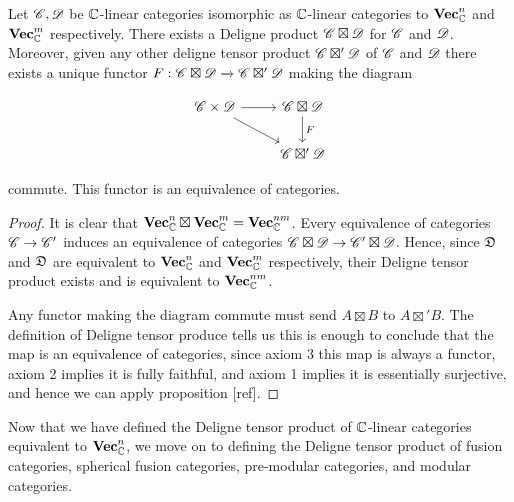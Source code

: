 \begin{proposition} Let $\mathscr{C},\mathscr{D}$ be $\mathbb{C}$-linear categories isomorphic as $\mathbb{C}$-linear categories to $\mathbf{Vec}_{\mathbb{C}}^n$ and $\mathbf{Vec}_{\mathbb{C}}^m$ respectively. There exists a Deligne product $\mathscr{C}\boxtimes \mathscr{D}$ for $\mathscr{C}$ and $\mathscr{D}$. Moreover, given any other deligne tensor product $\mathscr{C}\boxtimes' \mathscr{D}$ of $\mathscr{C}$ and $\mathscr{D}$ there exists a unique functor $F: \mathscr{C}\boxtimes \mathscr{D}\xrightarrow{} \mathscr{C}\boxtimes' \mathscr{D}$ making the diagram

\[\begin{tikzcd}
	{\C\times\Dcat} & {\C\boxtimes \Dcat} \\
	& {\C\boxtimes' \Dcat}
	\arrow[from=1-1, to=1-2]
	\arrow[from=1-1, to=2-2]
	\arrow["F", from=1-2, to=2-2]
\end{tikzcd}\]

commute. This functor is an equivalence of categories.
\end{proposition}
\begin{proof} It is clear that $\mathbf{Vec}_{\mathbb{C}}^n\boxtimes \mathbf{Vec}_{\mathbb{C}}^m = \mathbf{Vec}_{\mathbb{C}}^{nm}$. Every equivalence of categories $\mathscr{C} \to \mathscr{C}'$ induces an equivalence of categories $\mathscr{C}\boxtimes \mathscr{D}\to\mathscr{C}'\boxtimes \mathscr{D}$. Hence, since $\mathfrak{D}$ and $\mathfrak{D}$ are equivalent to $\mathbf{Vec}_{\mathbb{C}}^n$ and $\mathbf{Vec}_{\mathbb{C}}^m$ respectively, their Deligne tensor product exists and is equivalent to $\mathbf{Vec}_{\mathbb{C}}^{nm}$.

Any functor making the diagram commute must send $A\boxtimes B$ to $A\boxtimes' B$. The definition of Deligne tensor produce tells us this is enough to conclude that the map is an equivalence of categories, since axiom 3 this map is always a functor, axiom 2 implies it is fully faithful, and axiom 1 implies it is essentially surjective, and hence we can apply proposition [ref].
\end{proof}

Now that we have defined the Deligne tensor product of $\mathbb{C}$-linear categories equivalent to $\mathbf{Vec}_{\mathbb{C}}^n$, we move on to defining the Deligne tensor product of fusion categories, spherical fusion categories, pre-modular categories, and modular categories.

